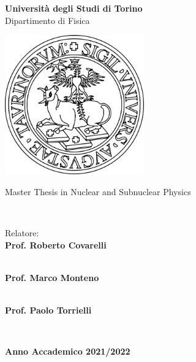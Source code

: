 \makeatletter
\begin{center}
{\LARGE \textbf{Università degli Studi di Torino}} \\
\vspace{0.2cm}
{\Large {Dipartimento di Fisica}} \\ 
\vspace{1cm}

\includegraphics[width=6cm]{Cover/img/unito-logo.png} \\
\vspace{1.1cm}

{\Large {Master Thesis in Nuclear and Subnuclear Physics}} \\
\vspace{1cm}

{\LARGE \textbf{\@title}} \\ 
\vspace{1.5cm}

\end{center}


\noindent
\begin{minipage}[t]{0.7\textwidth}
\noindent \large{Relatore:} \\
\large{\textbf{Prof. Roberto Covarelli}} \\
\vspace{0.1cm}

 \\
\large{\textbf{Prof. Marco Monteno}} \\
\vspace{0.1cm}

 \\
\large{\textbf{Prof. Paolo Torrielli}} \\
\vspace{0.1cm}

\end{minipage}%
\begin{minipage}[t]{0.3\textwidth}
\mbox{} \\
\end{minipage}

\vfill

\begin{center}
    \large{\textbf{Anno Accademico 2021/2022}}
\end{center}

\vspace{1cm}

\newpage